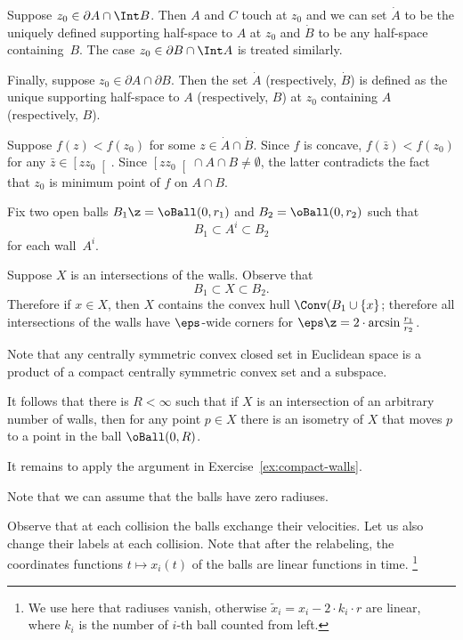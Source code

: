 Suppose $z_0\in\partial  A \cap \Int B$. 
Then $A$ and $C$ touch at $z_0$ and we can set $\dot A$ to be the uniquely defined supporting half-space to $A$  at $z_0$ and $\dot B$ to be any half-space containing~$B$. 
The case $z_0\in\partial B \cap \Int A$ is treated similarly.


Finally, suppose $z_0\in\partial A\cap\partial B$. 
Then the set  $\dot A$ (respectively, $\dot B$) is defined as the unique supporting half-space to $A$ (respectively, $B$) at $z_0$ containing $A$ (respectively, $B$).

Suppose $f(z)<f(z_0)$ for some $z\in \dot A\cap\dot B$.
Since $f$ is concave,
$f(\bar z)<f(z_0)$ for any $\bar z \in \left[zz_0\right[$.
Since $\left[zz_0\right[\cap A\cap B\ne\emptyset$,
the latter contradicts the fact that $z_0$ is minimum point of $f$ on $A\cap B$.


Fix two open balls $B_1\z=\oBall(0,r_1)$ and $B_2=\oBall(0,r_2)$
such that 
\[B_1\subset A^i\subset B_2\]
for each wall~$A^i$.

Suppose $X$ is an intersections of  the walls.
Observe that 
\[B_1\subset X\subset B_2.\]
Therefore if $x\in X$, then $X$ contains the convex hull $\Conv(B_1\cup\{x\}$;
therefore all intersections of the walls have $\eps$-wide corners for $\eps\z=2\cdot \arcsin\tfrac{r_1}{r_2}$.

Note that any centrally symmetric convex closed set in Euclidean space is a product of a compact centrally symmetric convex set and a subspace.

It follows that there is $R<\infty$
such that if $X$ is an intersection of an arbitrary number of walls, then for any point $p\in X$ there is an isometry of $X$ 
that moves  $p$ to a point in the ball $\oBall(0,R)$.

It remains to apply the argument in Exercise~\ref{ex:compact-walls}.

Note that we can assume that the balls have zero radiuses.

Observe that at each collision the balls exchange their velocities.
Let us also change their labels at each collision.
Note that after the relabeling,  the coordinates functions $t\mapsto x_{i}(t)$ of the balls are linear functions in time.%
\footnote{We use here that radiuses vanish, otherwise $\tilde x_i=x_i-2\cdot k_i\cdot r$ are linear, where $k_i$ is the number of $i$-th ball counted from left.} 

